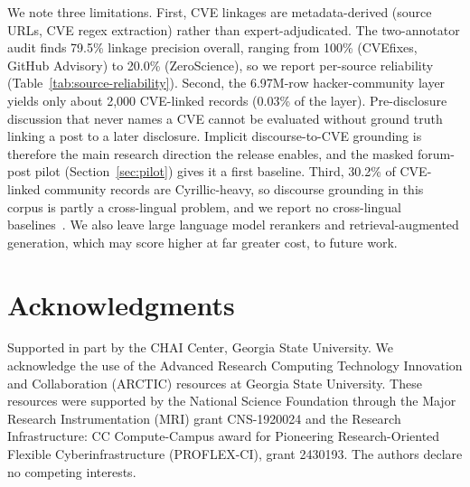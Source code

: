 \documentclass{article}
\begin{document}
We note three limitations. First, CVE linkages are metadata-derived (source URLs, CVE regex extraction) rather than expert-adjudicated. The two-annotator audit finds 79.5\% linkage precision overall, ranging from 100\% (CVEfixes, GitHub Advisory) to 20.0\% (ZeroScience), so we report per-source reliability (Table~\ref{tab:source-reliability}). Second, the 6.97M-row hacker-community layer yields only about 2,000 CVE-linked records (0.03\% of the layer). Pre-disclosure discussion that never names a CVE cannot be evaluated without ground truth linking a post to a later disclosure. Implicit discourse-to-CVE grounding is therefore the main research direction the release enables, and the masked forum-post pilot (Section~\ref{sec:pilot}) gives it a first baseline. Third, 30.2\% of CVE-linked community records are Cyrillic-heavy, so discourse grounding in this corpus is partly a cross-lingual problem, and we report no cross-lingual baselines~\citep{ebrahimi2020crosslingual}. We also leave large language model rerankers and retrieval-augmented generation, which may score higher at far greater cost, to future work.

\section*{Acknowledgments}
Supported in part by the CHAI Center, Georgia State University. We acknowledge the use of the Advanced Research Computing Technology Innovation and Collaboration (ARCTIC) resources at Georgia State University. These resources were supported by the National Science Foundation through the Major Research Instrumentation (MRI) grant CNS-1920024 and the Research Infrastructure: CC Compute-Campus award for Pioneering Research-Oriented Flexible Cyberinfrastructure (PROFLEX-CI), grant 2430193. The authors declare no competing interests.
\end{document}
